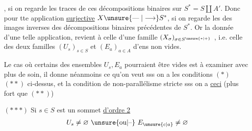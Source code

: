 , si on regarde les traces de ces décompositions binaires sur $S^\ast=S\amalg A'$. Donc pour tte application \uline{surjective} $X\unsure{\mathrel{\text{---}}|\longrightarrow}S^\ast$, si on regarde les des images inverses des décompositions binaires précédentes de $S^\ast$. Or la donnée d'une telle application, revient à celle d'une famille $(X_\sigma)_{\sigma\in S^{\unsure{\ast|+}}}$ , i.e.  celle des deux familles $(U_s)_{s\in S}$ et $(E_a)_{a\in A}$ d'ens non vides.

Le cas où certains des ensembles $U_s,E_a$ pourraient être vides est à examiner avec plus de soin, il donne néanmoins ce qu'on veut sss on a les conditions $(\ast)$ $(\ast\ast)$ ci-dessus, et la condition de non-parallélisme stricte sss on a \uline{ceci} (plus fort que $(\ast\ast)$)

$(\ast\ast\ast)$ Si $s\in S$ est un sommet \uline{d'ordre 2}    
\[
U_s\ne\varnothing\ \unsure{\text{ou}|\text{--}}\ E_{\unsure{c|a}}\ne\varnothing
\]
